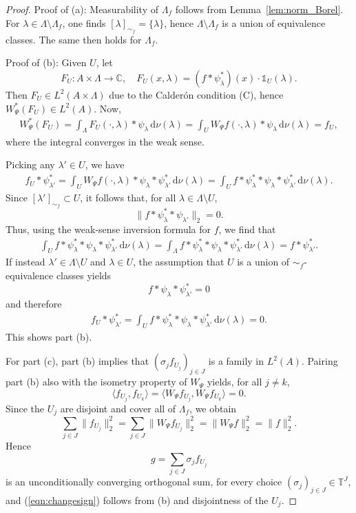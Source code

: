 \documentclass[10pt,a4paper]{amsart}
\newcommand{\T}{\mathbb{T}}
\newcommand{\dnu}{\,\mathrm{d}\nu}
\begin{document}
\begin{proof}
	Proof of (a): Measurability of $\Lambda_f$ follows from Lemma~\ref{lem:norm_Borel}. For $\lambda \in \Lambda \setminus \Lambda_f$, one finds $[\lambda]_{\sim_f} = \{ \lambda \}$, hence $\Lambda \setminus \Lambda_f$ is a union of equivalence classes. The same then holds for $\Lambda_f$. 
	
	Proof of (b): Given $U$, let 
	\[
	F_U: A \times \Lambda \to \mathbb{C},\quad F_U(x,\lambda) =  (f \ast \psi_\lambda^*)(x) \cdot \mathds{1}_{U}(\lambda).
	\]
	Then $F_U \in L^2(A \times \Lambda)$ due to the Calder\'on condition \textup{(C)}, hence $W_\Psi^\ast(F_U)\in L^2(A)$. Now,
	\begin{align*}
		W_\Psi^*(F_U) = \int_{\Lambda} F_U (\cdot ,\lambda) \ast \psi_\lambda \dnu(\lambda) 
		= \int_U W_\Psi f(\cdot,\lambda) \ast \psi_\lambda \dnu(\lambda)
		= f_U,
	\end{align*} 
	where the integral converges in the weak sense.
	
	Picking any $\lambda' \in U$, we have 
	\begin{align*}
		f_U \ast \psi_{\lambda'}^* = \int_U W_\Psi f(\cdot,\lambda) \ast \psi_\lambda \ast \psi_{\lambda'}^* \dnu(\lambda)
		=   \int_U f \ast \psi_\lambda^* \ast \psi_\lambda \ast \psi_{\lambda'}^* \dnu(\lambda).
	\end{align*}
	Since $[\lambda']_{\sim_f} \subset U$, it follows that, for all $\lambda \in \Lambda \setminus U$, 
	\[
	\| f \ast \psi_\lambda^* \ast \psi_{\lambda'} \|_2 = 0.
	\] 
	Thus, using the weak-sense inversion formula for $f$, we find that
	\begin{align*}
		\int_U f \ast \psi_\lambda^* \ast \psi_\lambda \ast \psi_{\lambda'}^* \dnu(\lambda) 
		= \int_\Lambda f \ast \psi_\lambda^* \ast \psi_\lambda \ast \psi_{\lambda'}^* \dnu(\lambda)
		= f \ast \psi_{\lambda'}^*.
	\end{align*} 
	If instead $\lambda' \in \Lambda \setminus U$ and $\lambda \in U$, the assumption that $U$ is a union of $\sim_f$-equivalence classes yields 
	\[ f \ast \psi_{\lambda} \ast \psi_{\lambda'}^* = 0 \]
	and therefore 
	\begin{align*}
		f_U \ast \psi_{\lambda'}^* = \int_U f \ast \psi_\lambda^*  \ast \psi_\lambda \ast \psi_{\lambda'}^* \dnu(\lambda)  = 0. 
	\end{align*}
	This shows part (b). 
	
	For part (c), part (b) implies that $(\sigma_j f_{U_j})_{j \in J}$ is a family in $L^2(A)$. Pairing part (b) also with the isometry property of $W_\Psi$ yields, for all $j \not= k$,  
	\[
	\langle f_{U_j}, f_{U_k} \rangle = \langle W_\Psi f_{U_j}, W_\Psi f_{U_k} \rangle = 0. 
	\] 
	Since the $U_j$ are disjoint and cover all of $\Lambda_f$, we obtain 
	\[
	\sum_{j \in J} \|f_{U_j} \|_2^2 = \sum_{j \in J} \| W_\Psi f_{U_j} \|_2^2 = \| W_\Psi f \|_2^2 = \| f \|_2^2.
	\]
	Hence
	\[
	g = \sum_{j \in J} \sigma_j f_{U_j}
	\] is an unconditionally converging orthogonal sum, for every choice $(\sigma_j)_{j \in J} \in \T^J$, and (\ref{eqn:changesign}) follows from (b) and disjointness of the $U_j$.
	

\end{proof}
\end{document}
